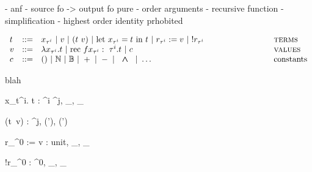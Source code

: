 \documentclass[a4paper,11pt,oneside]{article}
\theoremstyle{plain}
\newcommand{\bwedge}{\boldsymbol{~\wedge~}}
\newcommand{\bvee}{\boldsymbol{~\vee~}}
\begin{document}
- anf
- source fo -> output fo pure
- order arguments
- recursive function
- simplification
- highest order identity prhobited 


\begin{displaymath}
	\begin{array}{lll@{\hspace*{3cm}}l}
	t &::=& x_{\tau^{i}} ~|~ v~|~(t~v)
	~|~\text{let } x_{\tau^{i}} = t \text{ in } t 
	~|~ r_{\tau^i} := v ~|~ !r_{\tau^i} 
	& \textsc{terms}\\
	v &::=& \lambda x_{\tau^{i}}. t ~|~ \text{rec } f x_{\tau^{i}}:~\tau^{i}.t
	~|~ c  
	& \textsc{values} \\
	c &::=& \text{()} ~|~ \mathbb{N}~|~\mathbb{B}~|~+~|~-~|~\bwedge~|~\dots
	& \text{constants}	 
	\end{array}
\end{displaymath}

blah
\begin{footnotesize}
\begin{multicols}{2}	
\end{multicols}
\end{footnotesize}

\begin{footnotesize}
\begin{multicols}{2}	
	{\lambda x_{t^i}. t : \tau^{i} \stackrel{\theta, \rho}{\rightarrow} \tau^{j}, \bot_{\theta}, \bot_{\rho}}

	{(t~v) : \tau^{j}, (\theta \bvee \theta'), (\rho \bvee \rho')} 
\end{multicols}
\end{footnotesize}

\begin{footnotesize}
\begin{multicols}{2}	
	{r_{\tau^{0}} := v : unit, \top_{\theta}, \bot_{\rho}} 
	
\infrule[T$_{ML^{^2}}$-Deref]
	{}
	{!r_{\tau^{0}} : \tau^{0}, \bot_{\theta}, \bot_{\rho} }
\end{multicols}
\end{footnotesize}
\end{document}
